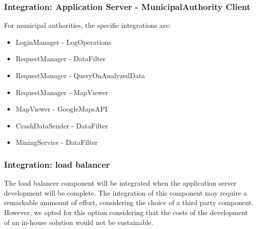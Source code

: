 \subsubsection{Integration: Application Server - MunicipalAuthority Client}
For municipal authorities, the specific integrations are:
\begin{itemize}
	\item LoginManager - LogOperations
	\item RequestManager - DataFilter
	\item RequestManager - QueryOnAnalyzedData
	\item RequestManager - MapViewer 
	\item MapViewer - GoogleMapsAPI
	\item CrashDataSender - DataFilter	
	\item MiningService - DataFilter
\end{itemize}

\subsubsection{Integration: load balancer}
The load balancer component will be integrated when the application server development will be complete. The integration of this component may require a remarkable ammount of effort, considering the choice of a third party component. However, we opted for this option considering that the costs of the development of an in-house solution would not be sustainable.